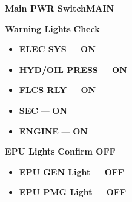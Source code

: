\begin{checklistenumerate}
{{        \label{fig:proc:prestart:mainpower}
    }
    \begin{subenumerate}
        \item \textbf{Main PWR Switch}\cbstart \dotfill \textbf{MAIN}\cbend
        \item \textbf{Warning Lights} \dotfill \textbf{Check}
        \begin{itemize}
            \item \textbf{ELEC SYS} --- \textbf{ON}
            \item \textbf{HYD/OIL PRESS} --- \textbf{ON}
            \item \textbf{FLCS RLY} --- \textbf{ON}
            \item \textbf{SEC} --- \textbf{ON}
            \item \textbf{ENGINE} --- \textbf{ON}
        \end{itemize}
        \item \textbf{EPU Lights} \dotfill \textbf{Confirm OFF}
        \begin{itemize}
            \item \textbf{EPU GEN Light} --- \textbf{OFF}
            \item \textbf{EPU PMG Light} --- \textbf{OFF}
        \end{itemize}
    \end{subenumerate}}
\end{checklistenumerate}

\clearpage

